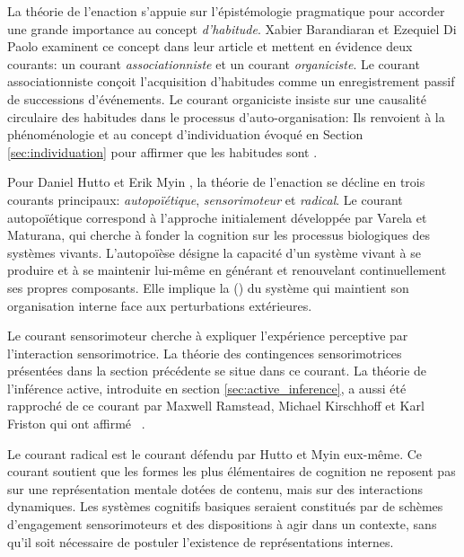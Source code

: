 La théorie de l'enaction s'appuie sur l'épistémologie pragmatique pour accorder une grande importance au concept \emph{d'habitude}.
Xabier Barandiaran et Ezequiel Di Paolo examinent ce concept dans leur article  \cite{barandiaran_genealogical_2014} et mettent en évidence deux courants: 
un courant \emph{associationniste} et un courant \emph{organiciste}. 
Le courant associationniste conçoit l'acquisition d'habitudes comme un enregistrement passif de successions d'événements. 
Le courant organiciste insiste sur une causalité circulaire des habitudes dans le processus d'auto-organisation:  
Ils renvoient à la phénoménologie et au concept d'individuation évoqué en Section \ref{sec:individuation} pour affirmer que %
les habitudes sont \og {} \fg . 


Pour Daniel Hutto et Erik Myin \cite{hutto_radicalizing_2013}, la théorie de l'enaction se décline en trois courants principaux: \emph{autopoïétique}, \emph{sensorimoteur} et \emph{radical}. 
Le courant autopoïétique correspond à l'approche initialement développée par Varela et Maturana, qui cherche à fonder la cognition sur les processus biologiques des systèmes vivants. 
L'autopoïèse désigne la capacité d'un système vivant à se produire et à se maintenir lui-même en générant et renouvelant continuellement ses propres composants. 
Elle implique la  () du système qui maintient son organisation interne face aux perturbations extérieures.

Le courant sensorimoteur cherche à expliquer l'expérience perceptive par l'interaction sensorimotrice.
La théorie des contingences sensorimotrices présentées dans la section précédente se situe dans ce courant. 
La théorie de l'inférence active, introduite en section \ref{sec:active_inference}, a aussi été rapproché de ce courant par Maxwell Ramstead, Michael Kirschhoff et Karl Friston qui ont affirmé \og {} \fg\ \cite{ramstead_tale_2020}. 

Le courant radical est le courant défendu par Hutto et Myin eux-même.
Ce courant soutient que les formes les plus élémentaires de cognition  ne reposent pas sur une représentation mentale dotées de contenu, mais sur des interactions dynamiques. 
Les systèmes cognitifs basiques seraient constitués par de schèmes d'engagement sensorimoteurs et des dispositions à agir dans un contexte, sans qu'il soit nécessaire de postuler l'existence de représentations internes.   


